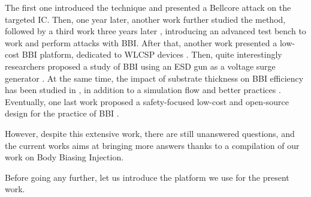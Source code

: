 		The first one \cite{bbiOrigin} introduced the technique and presented a Bellcore attack on the targeted IC.
		Then, one year later, another work \cite{bbiSecond} further studied the method, followed by a third work three years later \cite{bbiThird}, introducing an advanced test bench to work and perform attacks with BBI.
		After that, another work presented a low-cost BBI platform, dedicated to WLCSP devices \cite{bbiColin}.
		Then, quite interestingly researchers proposed a study of BBI using an ESD gun as a voltage surge generator \cite{japbbi, japbbi2}.
		At the same time, the impact of substrate thickness on BBI efficiency has been studied in \cite{mybbiCosade}, in addition to a simulation flow and better practices \cite{mybbiFdtc2022,mybbifdtc2023}.
		Eventually, one last work proposed a safety-focused low-cost and open-source design for the practice of BBI \cite{colinFdtc2023}.

		However, despite this extensive work, there are still unanswered questions, and the current works aims at bringing more answers thanks to a compilation of our work on Body Biasing Injection.

		Before going any further, let us introduce the platform we use for the present work.

%
%		
%

